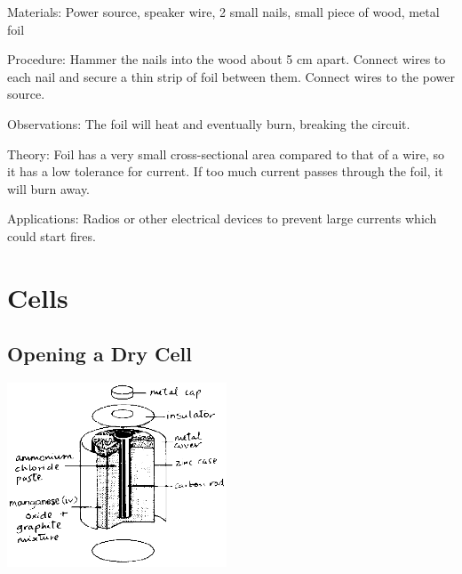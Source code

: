 \begin{multicols}{2}
\begin{description*}
\item[Materials:]{Power source, speaker wire, 2 small nails, small piece of wood, metal foil}
\item[Procedure:]{Hammer the nails into the wood about 5 cm apart. Connect wires to each nail and secure a thin strip of foil between them. Connect wires to the power source.}
\item[Observations:]{The foil will heat and eventually burn, breaking the circuit.}
\item[Theory:]{Foil has a very small cross-sectional area compared to that of a wire, so it has a low tolerance for current. If too much current passes through the foil, it will burn away.}
\item[Applications:]{Radios or other electrical devices to prevent large currents which could start fires.}
\end{description*}


\section*{Cells}


\subsection{Opening a Dry Cell} 

\begin{center}
\includegraphics[width=0.49\textwidth]{./img/source/dry-cell-a.png}
\end{center}


\end{multicols}
